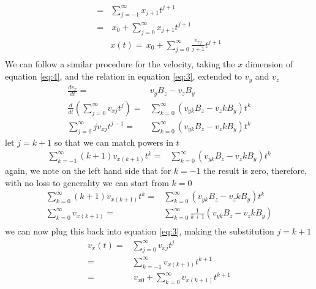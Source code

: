 \documentclass[9pt]{article}
\begin{document}
\begin{multicols}{2}
\begin{equation}
\begin{split}
                =&\sum_{j=-1}^\infty x_{j+1}t^{j+1}\\
                =&\,x_0 + \sum_{j=0}^\infty x_{j+1}t^{j+1}\\
                &\boxed{x(t)=\,x_0 + \sum_{j=0}^\infty\frac{v_{xj}}{j+1} t^{j+1}}\\ 
        \end{split}
    \end{equation}
We can follow a similar procedure for the velocity, taking the $x$ dimension of equation \ref{eq:4}, and the relation in equation \ref{eq:3}, extended to $v_y$ and $v_z$
    \begin{equation}
        \begin{split}
        \frac{dv_x}{dt}=&v_yB_z-v_zB_y\\
        \frac{d}{dt}\left(\sum_{j=0}^\infty v_{xj}t^j\right)=&\sum_{k=0}^\infty (v_{yk}B_z-v_zkB_y)t^k\\  
        \sum_{j=0}^\infty jv_{xj}t^{j-1}=&\sum_{k=0}^\infty (v_{yk}B_z-v_zkB_y)t^k  
        \end{split}
    \end{equation}
let $j=k+1$ so that we can match powers in $t$
    \begin{equation}
        \begin{split}  
        \sum_{k=-1}^\infty (k+1)v_{x(k+1)}t^{k}=&\sum_{k=0}^\infty (v_{yk}B_z-v_zkB_y)t^k  
        \end{split}
    \end{equation}
again, we note on the left hand side that for $k=-1$ the result is zero, therefore, with no loss to generality we can start from $k=0$
    \begin{equation}
        \begin{split}  
        \sum_{k=0}^\infty (k+1)v_{x(k+1)}t^{k}=&\sum_{k=0}^\infty (v_{yk}B_z-v_zkB_y)t^k  \\
        \sum_{k=0}^\infty v_{x(k+1)}=&\sum_{k=0}^\infty\frac{1}{k+1} (v_{yk}B_z-{v_zk}B_y)  \\
        \end{split}
    \end{equation}
we can now plug this back into equation \ref{eq:3}, making the substitution $j=k+1$
    \begin{equation}
        \begin{split}
            v_x(t)=&\sum_{j=0}^\infty v_{xj}t^j\\
                =&\sum_{k=-1}^\infty v_{x(k+1)}t^{k+1}\\
                =&\,v_{x0}+\sum_{k=0}^\infty v_{x(k+1)}t^{k+1}\\

\end{split}
\end{equation}
\end{multicols}
\end{document}
